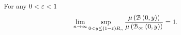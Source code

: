 \begin{lemma}\label{lem:average_degree_hyperbolic}
For any $0 < \varepsilon < 1$
\[
	\lim_{n \to \infty} \sup_{0 < y \le (1-\varepsilon)R_n} \frac{\mu\left({\mathcal B}\left(0,y\right)\right)}{\mu\left({\mathcal B}_{\infty}\left(0,y\right)\right)} = 1.
\]
\end{lemma}

